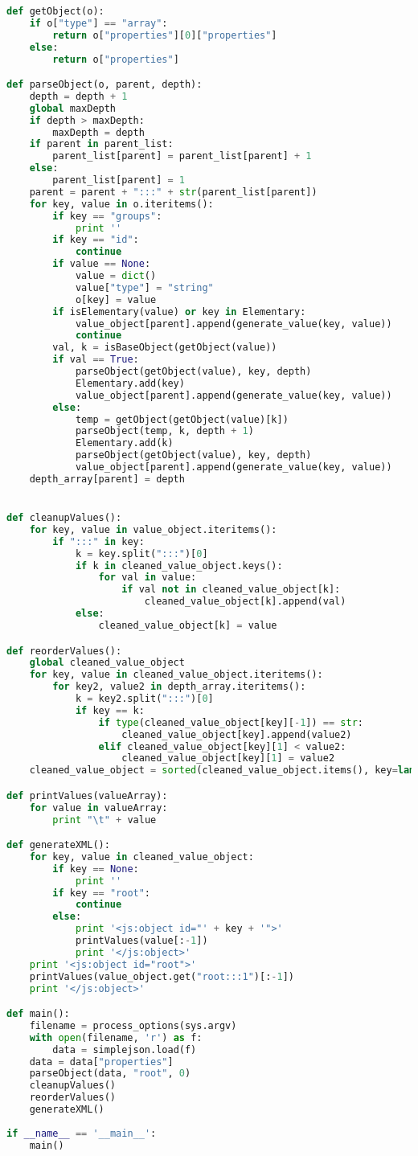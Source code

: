 \begin{lstlisting}[language=Python]
def getObject(o):
	if o["type"] == "array":
		return o["properties"][0]["properties"]
	else:
		return o["properties"]

def parseObject(o, parent, depth):
	depth = depth + 1
	global maxDepth
	if depth > maxDepth:
		maxDepth = depth
	if parent in parent_list:
		parent_list[parent] = parent_list[parent] + 1
	else:
		parent_list[parent] = 1
	parent = parent + ":::" + str(parent_list[parent])
	for key, value in o.iteritems():
		if key == "groups":
			print ''
		if key == "id":
			continue
		if value == None:
			value = dict()
			value["type"] = "string"
			o[key] = value
		if isElementary(value) or key in Elementary:
			value_object[parent].append(generate_value(key, value))
			continue
		val, k = isBaseObject(getObject(value))
		if val == True:
			parseObject(getObject(value), key, depth)
			Elementary.add(key)
			value_object[parent].append(generate_value(key, value))
		else:
			temp = getObject(getObject(value)[k])
			parseObject(temp, k, depth + 1)
			Elementary.add(k)
			parseObject(getObject(value), key, depth)
			value_object[parent].append(generate_value(key, value))
	depth_array[parent] = depth


def cleanupValues():
	for key, value in value_object.iteritems():
		if ":::" in key:
			k = key.split(":::")[0]
			if k in cleaned_value_object.keys():
				for val in value:
					if val not in cleaned_value_object[k]:
						cleaned_value_object[k].append(val)
			else:
				cleaned_value_object[k] = value

def reorderValues():
	global cleaned_value_object
	for key, value in cleaned_value_object.iteritems():
		for key2, value2 in depth_array.iteritems():
			k = key2.split(":::")[0]
			if key == k:
				if type(cleaned_value_object[key][-1]) == str:
					cleaned_value_object[key].append(value2)
				elif cleaned_value_object[key][1] < value2:
					cleaned_value_object[key][1] = value2
	cleaned_value_object = sorted(cleaned_value_object.items(), key=lambda x: x[1][-1], reverse=True)

def printValues(valueArray):
	for value in valueArray:
		print "\t" + value

def generateXML():
	for key, value in cleaned_value_object:
		if key == None:
			print ''
		if key == "root":
			continue
		else:
			print '<js:object id="' + key + '">'
			printValues(value[:-1])
			print '</js:object>'
	print '<js:object id="root">'
	printValues(value_object.get("root:::1")[:-1])
	print '</js:object>'

def main():
	filename = process_options(sys.argv)
	with open(filename, 'r') as f:
		data = simplejson.load(f)
	data = data["properties"]
	parseObject(data, "root", 0)
	cleanupValues()
	reorderValues()
	generateXML()
			
if __name__ == '__main__':
	main()
\end{lstlisting}
